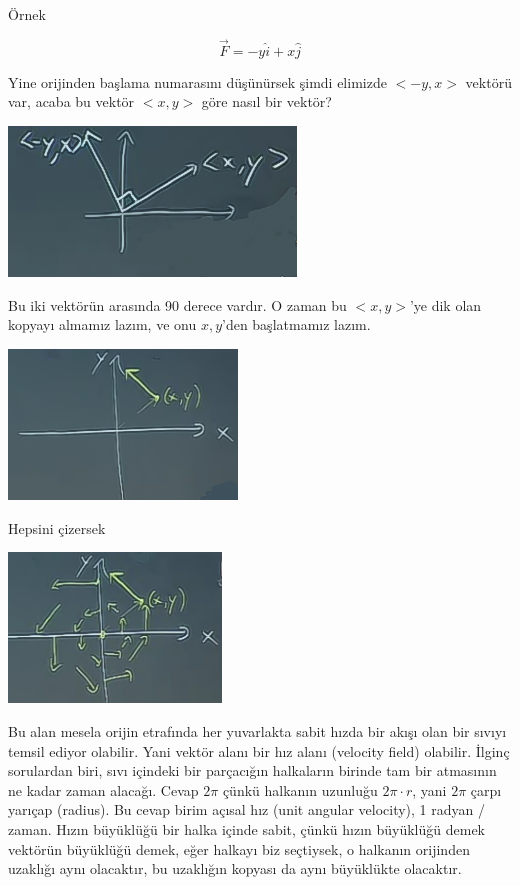\documentclass[12pt,fleqn]{article}\usepackage{../../common}
\begin{document}
Örnek

$$ \vec{F} = -y\hat{i} + x\hat{j} $$

Yine orijinden başlama numarasını düşünürsek şimdi elimizde $< -y,x >$
vektörü var, acaba bu vektör $< x,y >$ göre nasıl bir vektör? 

\includegraphics[height=4cm]{19_5.png}

Bu iki vektörün arasında 90 derece vardır. O zaman bu $< x,y >$'ye dik olan
kopyayı almamız lazım, ve onu $x,y$'den başlatmamız lazım. 

\includegraphics[height=4cm]{19_6.png}

Hepsini çizersek

\includegraphics[height=4cm]{19_7.png}

Bu alan mesela orijin etrafında her yuvarlakta sabit hızda bir akışı olan bir
sıvıyı temsil ediyor olabilir. Yani vektör alanı bir hız alanı (velocity field)
olabilir. İlginç sorulardan biri, sıvı içindeki bir parçacığın halkaların
birinde tam bir atmasının ne kadar zaman alacağı. Cevap $2\pi$ çünkü halkanın
uzunluğu $2\pi \cdot r$, yani $2\pi$ çarpı yarıçap (radius). Bu cevap birim
açısal hız (unit angular velocity), 1 radyan / zaman. Hızın büyüklüğü bir halka
içinde sabit, çünkü hızın büyüklüğü demek vektörün büyüklüğü demek, eğer halkayı
biz seçtiysek, o halkanın orijinden uzaklığı aynı olacaktır, bu uzaklığın
kopyası da aynı büyüklükte olacaktır.
\end{document}
